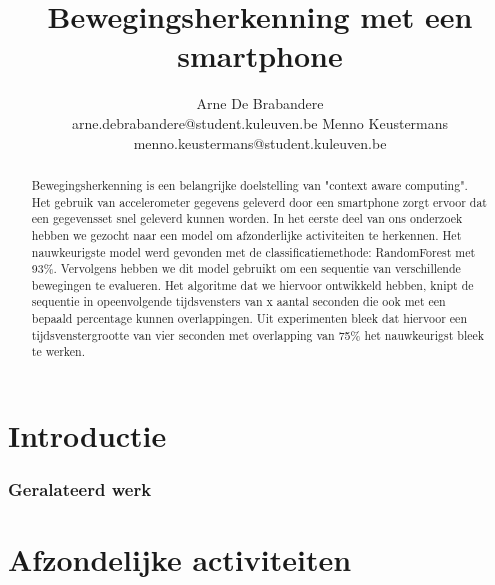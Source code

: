 \documentclass{article}
\title{Bewegingsherkenning met een smartphone}
\author{Arne De Brabandere\\
	arne.debrabandere@student.kuleuven.be
    \And
    Menno Keustermans\\
    menno.keustermans@student.kuleuven.be}
\begin{document}
\maketitle

\begin{abstract}

Bewegingsherkenning is een belangrijke doelstelling van "context aware computing". Het gebruik van accelerometer gegevens geleverd door een smartphone zorgt ervoor dat een gegevensset snel geleverd kunnen worden. In het eerste deel van ons onderzoek hebben we gezocht naar een model om afzonderlijke activiteiten te herkennen. Het nauwkeurigste model werd gevonden met de classificatiemethode: RandomForest met 93\%. Vervolgens hebben we dit model gebruikt om een sequentie van verschillende bewegingen te evalueren. Het algoritme dat we hiervoor ontwikkeld hebben, knipt de sequentie in opeenvolgende tijdsvensters van x aantal seconden die ook met een bepaald percentage kunnen overlappingen. Uit experimenten bleek dat hiervoor een tijdsvenstergrootte van vier seconden met overlapping van 75\% het nauwkeurigst bleek te werken.

\end{abstract}

\section{Introductie}


\subsubsection{Geralateerd werk}




\section{Afzondelijke activiteiten}
\end{document}
